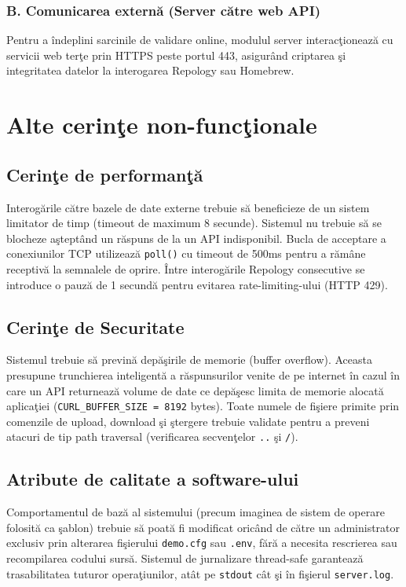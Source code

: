 \documentclass[12pt, a4paper]{article}
\begin{document}
\subsubsection*{B. Comunicarea extern\u{a} (Server c\u{a}tre web API)}

Pentru a \^{i}ndeplini sarcinile de validare online, modulul server interac\c{t}ioneaz\u{a} cu servicii web ter\c{t}e
prin HTTPS peste portul 443, asigur\^{a}nd criptarea \c{s}i integritatea datelor la interogarea Repology
sau Homebrew.

\section{Alte cerin\c{t}e non-func\c{t}ionale}

\subsection{Cerin\c{t}e de performan\c{t}\u{a}}

Interog\u{a}rile c\u{a}tre bazele de date externe trebuie s\u{a} beneficieze de un sistem limitator de timp (timeout
de maximum 8 secunde). Sistemul nu trebuie s\u{a} se blocheze a\c{s}tept\^{a}nd un r\u{a}spuns de la un API
indisponibil. Bucla de acceptare a conexiunilor TCP utilizeaz\u{a} \texttt{poll()} cu timeout de 500ms pentru
a r\u{a}mâne receptiv\u{a} la semnalele de oprire. \^{I}ntre interog\u{a}rile Repology consecutive se introduce o
pauz\u{a} de 1 secund\u{a} pentru evitarea rate-limiting-ului (HTTP 429).

\subsection{Cerin\c{t}e de Securitate}

Sistemul trebuie s\u{a} previn\u{a} dep\u{a}\c{s}irile de memorie (buffer overflow). Aceasta presupune trunchierea
inteligent\u{a} a r\u{a}spunsurilor venite de pe internet \^{i}n cazul \^{i}n care un API returneaz\u{a} volume de date
ce dep\u{a}\c{s}esc limita de memorie alocat\u{a} aplica\c{t}iei (\texttt{CURL\_BUFFER\_SIZE = 8192} bytes). Toate
numele de fi\c{s}iere primite prin comenzile de upload, download \c{s}i \c{s}tergere trebuie validate pentru a
preveni atacuri de tip path traversal (verificarea secven\c{t}elor \texttt{..} \c{s}i \texttt{/}).

\subsection{Atribute de calitate a software-ului}

Comportamentul de baz\u{a} al sistemului (precum imaginea de sistem de operare folosit\u{a} ca \c{s}ablon)
trebuie s\u{a} poat\u{a} fi modificat oric\^{a}nd de c\u{a}tre un administrator exclusiv prin alterarea fi\c{s}ierului
\texttt{demo.cfg} sau \texttt{.env}, f\u{a}r\u{a} a necesita rescrierea sau recompilarea codului surs\u{a}. Sistemul de
jurnalizare thread-safe garanteaz\u{a} trasabilitatea tuturor opera\c{t}iunilor, at\^{a}t pe \texttt{stdout} c\^{a}t \c{s}i
\^{i}n fi\c{s}ierul \texttt{server.log}.
\end{document}
